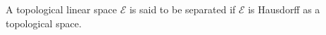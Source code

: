 A topological linear space $\mathcal{E}$ is said to be separated if $\mathcal{E}$ is Hausdorff as a topological space.

